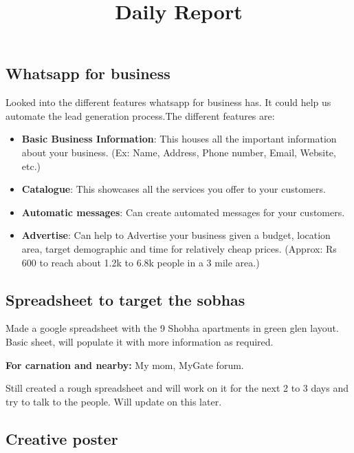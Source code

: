 \documentclass[12pt, a4paper]{article}
\begin{document}
\title{Daily Report}
\maketitle

\subsection{Whatsapp for business}

Looked into the different features whatsapp for business has. It could help us automate the lead generation process.The different features are:

\begin{itemize}
    \item \textbf{Basic Business Information}: This houses all the important information about your business. (Ex: Name, Address, Phone number, Email, Website, etc.)
    \item \textbf{Catalogue}: This showcases all the services you offer to your customers.
    \item \textbf{Automatic messages}: Can create automated messages for your customers.
    \item \textbf{Advertise}: Can help to Advertise your business given a budget, location area, target demographic and time for relatively cheap prices. (Approx: Rs 600 to reach about 1.2k to 6.8k people in a 3 mile area.)
\end{itemize}


\vspace{0.5cm}

\subsection{Spreadsheet to target the sobhas}

Made a google spreadsheet with the 9 Shobha apartments in green glen layout. Basic sheet, will populate it with more information as required.

\vspace{0.25cm}

\noindent \textbf{For carnation and nearby:} My mom, MyGate forum.

\vspace{0.25cm}

\noindent Still created a rough spreadsheet and will work on it for the next 2 to 3 days and try to talk to the people. Will update on this later.

\subsection{Creative poster}
\end{document}
